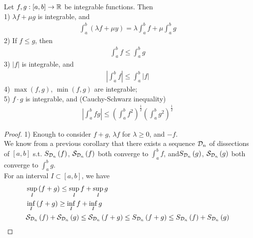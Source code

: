 \documentclass[a4paper]{article}
\begin{document}
\begin{thm}
Let $f,g: \left[a,b\right] \to \mathbb{R}$ be integrable functions. Then\\
1) $\lambda f + \mu g$ is integrable, and
\begin{equation*}
\begin{aligned}
\int_a^b\left(\lambda f+\mu y\right) = \lambda \int_a^b f + \mu \int_a^b g
\end{aligned}
\end{equation*}
2) If $f\leq g$, then 
\begin{equation*}
\begin{aligned}
\int_a^b f \leq \int_a^b g
\end{aligned}
\end{equation*}
3) $|f|$ is integrable, and
\begin{equation*}
\begin{aligned}
|\int_a^b f | \leq \int_a^b |f|
\end{aligned}
\end{equation*}
4) $\max\left(f,g\right)$, $\min\left(f,g\right)$ are integrable;\\
5) $f \cdot g$ is integrable, and (Cauchy-Schwarz inequality)
\begin{equation*}
\begin{aligned}
|\int_a^b fg | \leq \left(\int_a^b f^2 \right)^\frac{1}{2} \left(\int_a^b g^2 \right)^\frac{1}{2}
\end{aligned}
\end{equation*}
\begin{proof}
1) Enough to consider $f+g$, $\lambda f$ for $\lambda \geq 0$, and $-f$.\\
We know from a previous corollary that there exists a sequence $\mathcal{D}_n$ of dissections of $\left[a,b\right]$ s.t. $S_{\mathcal{D}_n} \left(f\right)$, $\mathcal{S}_{\mathcal{D}_n} \left(f\right)$ both converge to $\int_a^b f$, and$S_{\mathcal{D}_n} \left(g\right)$, $\mathcal{S}_{\mathcal{D}_n} \left(g\right)$ both converge to $\int_a^b g$.\\
For an interval $I\subset\left[a,b\right]$, we have
\begin{equation*}
\begin{aligned}
&\sup_I \left(f+g\right) \leq \sup_I f + \sup_I g\\
&\inf_I \left(f+g\right) \geq \inf_I f + \inf_I g\\
&\S_{\D_n} \left(f\right) + \S_{\D_n} \left(g\right) \leq \S_{\D_n} \left(f+g\right) \leq S_{\D_n} \left(f+g\right) \leq S_{\D_n} \left(f\right) + S_{\D_n} \left(g\right)
\end{aligned}

\end{equation*}
\end{proof}
\end{thm}
\end{document}
